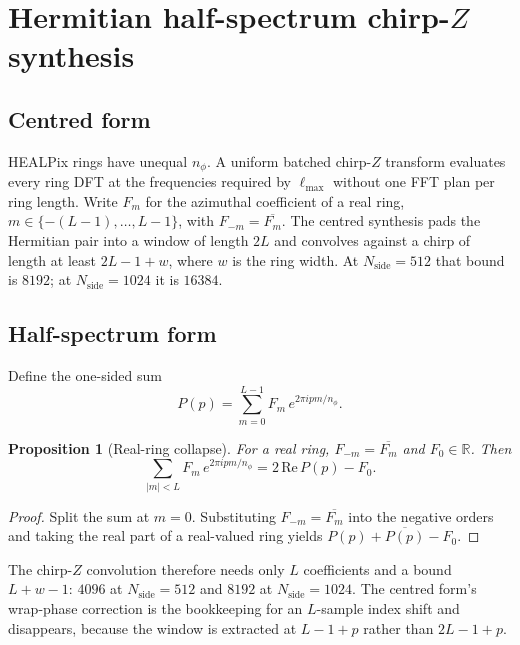 \documentclass[usenatbib,useAMS]{mnras}
\newtheorem{proposition}{Proposition}
\begin{document}
\section{Hermitian half-spectrum chirp-\texorpdfstring{$Z$}{Z} synthesis}

\subsection{Centred form}

HEALPix rings have unequal $n_\phi$. A uniform batched chirp-$Z$ transform \citep{bluestein1970} evaluates every ring DFT at the frequencies required by $\ell_{\max}$ without one FFT plan per ring length. Write $F_m$ for the azimuthal coefficient of a real ring, $m\in\{-(L-1),\ldots,L-1\}$, with $F_{-m}=\overline{F_m}$. The centred synthesis pads the Hermitian pair into a window of length $2L$ and convolves against a chirp of length at least $2L-1+w$, where $w$ is the ring width. At $N_{\mathrm{side}}=512$ that bound is $8192$; at $N_{\mathrm{side}}=1024$ it is $16384$.

\subsection{Half-spectrum form}

Define the one-sided sum
\begin{equation}
  P(p)=\sum_{m=0}^{L-1} F_m\,e^{2\pi i p m/n_\phi}.
\end{equation}

\begin{proposition}[Real-ring collapse]
\label{prop:herm}
For a real ring, $F_{-m}=\overline{F_m}$ and $F_0\in\mathbb{R}$. Then
\begin{equation}
  \sum_{\lvert m\rvert<L} F_m\,e^{2\pi i p m/n_\phi}
  = 2\,\mathrm{Re}\,P(p)-F_0.
\end{equation}
\end{proposition}

\begin{proof}
Split the sum at $m=0$. Substituting $F_{-m}=\overline{F_m}$ into the negative orders and taking the real part of a real-valued ring yields $P(p)+\overline{P(p)}-F_0$.
\end{proof}

The chirp-$Z$ convolution therefore needs only $L$ coefficients and a bound $L+w-1$: $4096$ at $N_{\mathrm{side}}=512$ and $8192$ at $N_{\mathrm{side}}=1024$. The centred form's wrap-phase correction is the bookkeeping for an $L$-sample index shift and disappears, because the window is extracted at $L-1+p$ rather than $2L-1+p$.
\end{document}
